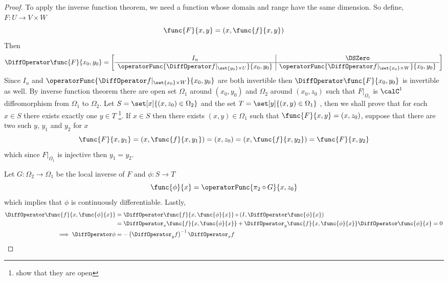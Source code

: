 \begin{proof}
    To apply the inverse function theorem, we need a function whose domain and range have the same dimension. So define, \(F: U \to V \times W\)
    \begin{equation*}
        \func{F}{x,y} = (x,\func{f}{x,y})
    \end{equation*}
    Then
    \begin{equation*}
        \DiffOperator \func{F}{x_0,y_0} = \left[\begin{array}{c|c}
                I_n                                                           & \DSZero                                                       \\ \hline
                \operatorFunc{\DiffOperator f|_{\set{y_0} \times U}}{x_0,y_0} & \operatorFunc{\DiffOperator f|_{\set{x_0} \times W}}{x_0,y_0}
            \end{array}\right]
    \end{equation*}
    Since \(I_n\) and \(\operatorFunc{\DiffOperator f|_{\set{x_0} \times W}}{x_0,y_0}\) are both invertible then \(\DiffOperator \func{F}{x_0,y_0}\) is invertible as well. By inverse function theorem there are open set \(\Omega_1\) around \((x_0,y_0)\) and \(\Omega_2\) around \((x_0,z_0)\) such that \(F|_{\Omega_1}\) is \(\calC^1\) diffeomorphism from \(\Omega_1\) to \(\Omega_2\). Let \(S = \set[x]{(x,z_0) \in \Omega_2}\) and the set \(T = \set[y]{(x,y) \in \Omega_1}\) , then we shall prove that for each \(x \in S\) there exists exactly one \(y \in T\) \footnote{show that they are open}. If \(x \in S\) then there exists \((x,y) \in \Omega_1\) such that \(\func{F}{x,y} = (x,z_0)\), suppose that there are two such \(y\), \(y_1\) and \(y_2\) for \(x\)
    \begin{equation*}
        \func{F}{x,y_1} = (x,\func{f}{x,y_1}) = (x,z_0) = (x,\func{f}{x,y_2}) = \func{F}{x,y_2}
    \end{equation*}
    which since \(F|_{\Omega_1}\) is injective then \(y_1 = y_2\).

    Let \(G: \Omega_2 \to \Omega_1\) be the local inverse of \(F\) and \(\phi : S \to T\)
    \begin{equation*}
        \func{\phi}{x} = \operatorFunc{ \pi_2 \circ G}{x,z_0}
    \end{equation*}
    which implies that \(\phi\) is continuously differentiable. Lastly,
    \begin{align*}
        \DiffOperator \func{f}{x,\func{\phi}{x}} & = \DiffOperator \func{f}{x,\func{\phi}{x}} \circ (I, \DiffOperator \func{\phi}{x})                                         \\
                                                 & = \DiffOperator_x \func{f}{x,\func{\phi}{x}} + \DiffOperator_y  \func{f}{x,\func{\phi}{x}}\DiffOperator \func{\phi}{x} = 0 \\
        \implies  \DiffOperator \phi             & = - \left(\DiffOperator_y f\right)^{-1} \DiffOperator_x f
    \end{align*}
\end{proof}


